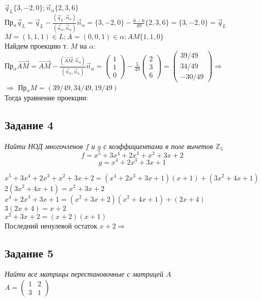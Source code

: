 \documentclass[a4paper]{article}
\theoremstyle{definition}
\theoremstyle{plain}
\begin{document}
$\vec{q}_{L}\{3, -2, 0\}; \vec{n}_{\alpha}\{2, 3, 6\}$\\
Пр$_{\alpha}\vec{q}_{L} = \vec{q}_{L} - \frac{(\vec{q}_{L}, \vec{n}_{\alpha})}{(\vec{n}_{\alpha}, \vec{n}_{\alpha})} \vec{n}_{\alpha} = %
\{3, -2, 0\} - \frac{6 - 6}{49}\{2, 3, 6\} = \{3, -2, 0\} = \vec{q}_{L}$\\
$M = (1, 1, 1) \in L; A = (0, 0, 1) \in \alpha; AM\{1, 1, 0\}$\\
Найдем проекцию т. $M$ на $\alpha$:\\
Пр$_{\alpha}\vec{AM} = \vec{AM} - \frac{(\vec{AM}, \vec{n}_{\alpha})}{(\vec{n}_{\alpha}, \vec{n}_{\alpha})}\vec{n}_{\alpha} = %
\begin{pmatrix}
  1\\ 1\\ 0
\end{pmatrix}
-
\frac{5}{49}
\begin{pmatrix}
  2\\ 3\\ 6
\end{pmatrix}
=
\begin{pmatrix}
  39/49\\ 34/49\\ -30/49
\end{pmatrix}
\Rightarrow$\\
$\Rightarrow$ Пр$_{\alpha}M = (39/49, 34/49, 19/49)$\\
Тогда уравнение проекции: 

\subsection*{Задание 4}

\emph{Найти \emph{НОД} многочленов $f$ и $g$ с коэффициентами в поле вычетов $\mathbb{Z}_{5}$}
\[
f = x^{5} + 3x^{4} + 2x^{3} + x^{2} + 3x + 2
\]
\[
g = x^{4} + 2x^{3} + 3x + 1
\]

\noindent $
x^{5} + 3x^{4} + 2x^{3} + x^{2} + 3x + 2
=
(x^{4} + 2x^{3} + 3x + 1)
(x + 1)
+
(3x^{2}+4x+1)
$\\
$
2(3x^{2}+4x+1) = x^{2}+3x+2
$\\
$
x^{4} + 2x^{3} + 3x + 1
=
(x^{2}+3x+2)
(x^{2}+4x+1)
+
(2x+4)
$\\
$
3(2x+4) = x+2
$\\
$
x^{2}+3x+2
=
(x + 2)
(x + 1)
$\\
Последний ненулевой остаток $x + 2 \Rightarrow$ 
\subsection*{Задание 5}
\emph{Найти все матрицы перестановочные с матрицей $A$}\\
$A =
\begin{pmatrix}
  1 & 2\\
  3 & 1
\end{pmatrix}$
\end{document}
